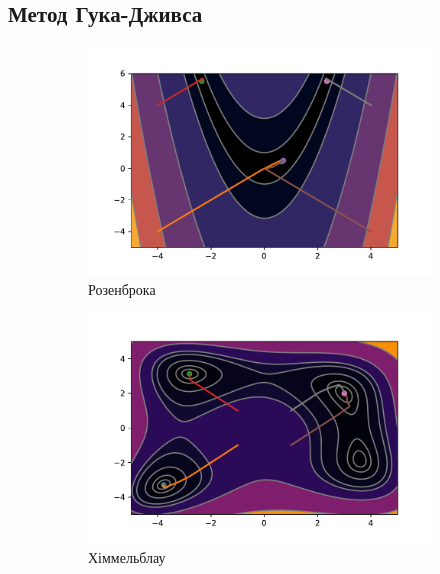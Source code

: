 \pagebreak
\subsection*{Метод Гука-Дживса}

\begin{figure}[h!]
    \begin{subfigure}{0.5\textwidth}
        \includegraphics[width=\textwidth, trim=1cm 0.5cm 1.3cm 1cm, clip]{assets/HookeJeeves/rosenbrock.pdf}
        \caption{Розенброка}
    \end{subfigure}
    \begin{subfigure}{0.5\textwidth}
        \includegraphics[width=\textwidth, trim=1cm 0.5cm 1.3cm 1cm, clip]{assets/HookeJeeves/himmelblau.pdf}
        \caption{Хіммельблау}
    \end{subfigure}
    \begin{subfigure}{\textwidth}

\end{subfigure}
\end{figure}
